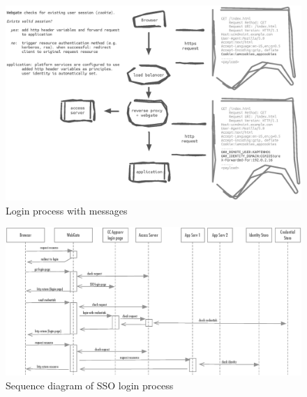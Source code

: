 \newpage

\begin{figure}
    \centering
    \includegraphics[width=1\textwidth]{diag/msgdiag}
    \caption{Login process with messages}
\end{figure}


\begin{figure}
    \centering
    \includegraphics[width=1\textwidth]{diag/seqdiag}
    \caption{Sequence diagram of SSO login process}
\end{figure}


